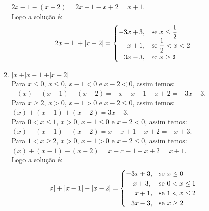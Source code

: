 \documentclass[10pt]{book}
\begin{document}
\begin{enumerate}
\begin{enumerate}
			$2x-1-(x-2)=2x-1-x+2=x+1$.\\
			Logo a solução é:\\
			\begin{equation*}
		    	\vert 2x -1 \vert + \vert x -2\vert =
			    \begin{cases}
			      \hfill -3x+3, & \text{se}\ x\leq\dfrac{1}{2} \\
			      \hfill x+1, & \text{se}\ \dfrac{1}{2} < x < 2\\
			      \hfill 3x-3, & \text{se}\ x \geq 2 
		    	\end{cases}
			\end{equation*}
			\item %
			$\vert x \vert + \vert x - 1\vert + \vert x - 2 \vert$\\
			Para $x \leq 0$, $x \leq 0$, $x - 1 < 0$ e $x -2 <0$, assim temos:\\
			$-(x)-(x-1)-(x-2)=-x-x+1-x+2=-3x+3$.\\
			Para $x \geq 2$, $x > 0$, $x-1 >0$ e $x -2 \leq 0$, assim temos:\\
			$(x)+(x-1)+(x-2)=3x-3$.\\
			Para $0 < x \leq 1$, $x>0$, $x -1 \leq 0$ e $x - 2 < 0$, assim temos:\\
			$(x) -(x-1)-(x-2)=x-x+1-x+2=-x+3$.\\
			Para $1 < x \geq 2$, $x>0$, $x -1 > 0$ e $x - 2 \leq 0$, assim temos:\\
			$(x) + (x -1)-(x-2)=x+x-1-x+2=x+1$.\\
			Logo a solução é:\\
			\begin{equation*}
		    	\vert x \vert + \vert x - 1\vert + \vert x - 2 \vert =
			    \begin{cases}
			      \hfill -3x+3, & \text{se}\ x \leq 0 \\
			      \hfil -x+3, & \text{se}\ 0 < x \leq 1 \\
			      \hfill x+1, & \text{se}\ 1 < x \leq 2\\
			      \hfill 3x-3, & \text{se}\ x \geq 2
		    	\end{cases}
			\end{equation*}
		\end{enumerate}
\end{enumerate}
\end{document}
